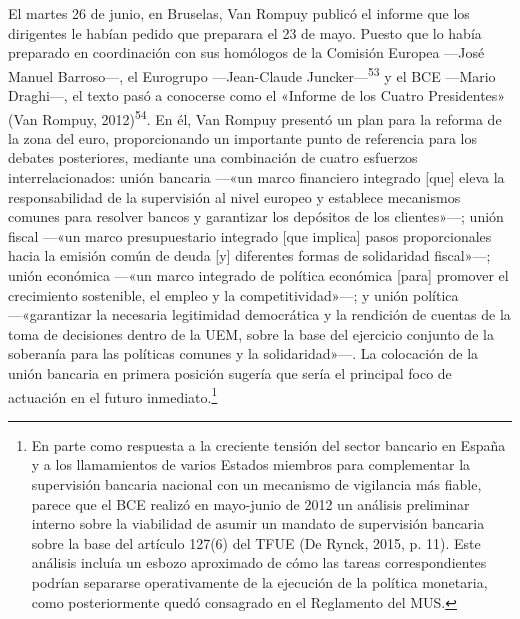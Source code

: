 \documentclass[10pt,a4paper]{article}
\begin{document}
{El martes 26 de junio, en Bruselas, Van Rompuy publicó el informe que los dirigentes le habían pedido que preparara el 23 de mayo. Puesto que lo había preparado en coordinación con sus homólogos de la Comisión Europea —José Manuel Barroso—, el Eurogrupo —Jean-Claude Juncker—\textsuperscript{53} y el BCE —Mario Draghi—, el texto pasó a conocerse como el «Informe de los Cuatro Presidentes» (Van Rompuy, 2012)\textsuperscript{54}. En él, Van Rompuy presentó un plan para la reforma de la zona del euro, proporcionando un importante punto de referencia para los debates posteriores, mediante una combinación de cuatro esfuerzos interrelacionados: unión bancaria —«un marco financiero integrado [que] eleva la responsabilidad de la supervisión al nivel europeo y establece mecanismos comunes para resolver bancos y garantizar los depósitos de los clientes»—; unión fiscal —«un marco presupuestario integrado [que implica] pasos proporcionales hacia la emisión común de deuda [y] diferentes formas de solidaridad fiscal»—; unión económica —«un marco integrado de política económica [para] promover el crecimiento sostenible, el empleo y la competitividad»—; y unión política —«garantizar la necesaria legitimidad democrática y la rendición de cuentas de la toma de decisiones dentro de la UEM, sobre la base del ejercicio conjunto de la soberanía para las políticas comunes y la solidaridad»—. La colocación de la unión bancaria en primera posición sugería que sería el principal foco de actuación en el futuro inmediato.\footnote{%
    En parte como respuesta a la creciente tensión del sector bancario en España y a los llamamientos de varios Estados miembros para complementar la supervisión bancaria nacional con un mecanismo de vigilancia más fiable, parece que el BCE realizó en mayo-junio de 2012 un análisis preliminar interno sobre la viabilidad de asumir un mandato de supervisión bancaria sobre la base del artículo 127(6) del TFUE (De Rynck, 2015, p. 11). Este análisis incluía un esbozo aproximado de cómo las tareas correspondientes podrían separarse operativamente de la ejecución de la política monetaria, como posteriormente quedó consagrado en el Reglamento del MUS.
}

}
\end{document}
